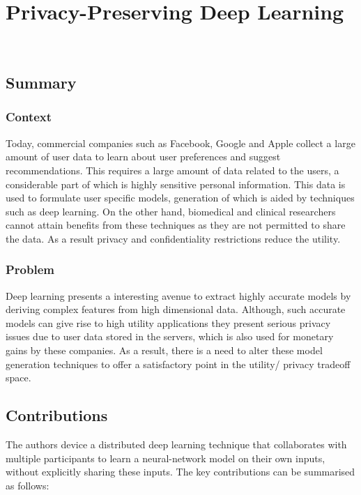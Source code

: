 \newpage
\section{Privacy-Preserving Deep Learning~\cite{Shokri:2015:PDL:2810103.2813687}}~\label{lect5}

\subsection*{Summary}

\subsubsection*{Context}

Today, commercial companies such as Facebook, Google and Apple collect a large amount of user data to learn 
about user preferences and suggest recommendations. This requires a large amount of data related to the users, 
a considerable part of which is highly sensitive personal information. This data is used to formulate user specific 
models, generation of which is aided by techniques such as deep learning. On the other hand, biomedical and 
clinical researchers cannot attain benefits from these techniques as they are not permitted to share the data. As 
a result privacy and confidentiality restrictions reduce the utility. 

\subsubsection*{Problem}

Deep learning presents a interesting avenue to extract highly accurate models by deriving complex features from high
dimensional data. Although, such accurate models can give rise to high utility applications they present serious
privacy issues due to user data stored in the servers, which is also used for monetary gains by these companies. As 
a result, there is a need to alter these model generation techniques to offer a satisfactory point in the utility/
privacy tradeoff space. 

\subsection*{Contributions}

The authors device a distributed deep learning technique that collaborates with multiple participants to learn a 
neural-network model on their own inputs, without explicitly sharing these inputs. The key contributions can be 
summarised as follows: 

